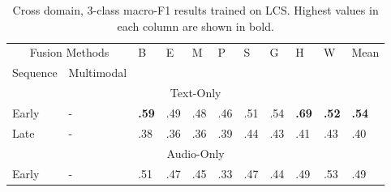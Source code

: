 \documentclass{article}
\begin{document}
\begin{table}[h]
\centering
\caption{Cross domain, 3-class macro-F1 results trained on LCS. Highest values in each column are shown in bold.}
\begin{tabular}{|lllllllllll|}
\hline
\multicolumn{2}{|c|}{Fusion Methods}                                              & \multirow{2}{*}{B} & \multirow{2}{*}{E} & \multirow{2}{*}{M} & \multirow{2}{*}{P} & \multirow{2}{*}{S} & \multirow{2}{*}{G} & \multirow{2}{*}{H} & \multicolumn{1}{l|}{\multirow{2}{*}{W}} & \multirow{2}{*}{Mean} \\ \cline{1-2}
\multicolumn{1}{|l|}{Sequence}               & \multicolumn{1}{l|}{Multimodal}    &                    &                    &                    &                    &                    &                    &                    & \multicolumn{1}{l|}{}                   &                       \\ \hline
\multicolumn{11}{|c|}{Text-Only}                                                                                                                                                                                                                                                                       \\ \hline
\multicolumn{1}{|l|}{Early}                  & \multicolumn{1}{l|}{-}             & \textbf{.59}       & .49                & .48                & .46                & .51                & .54                & \textbf{.69}       & \multicolumn{1}{l|}{\textbf{.52}}       & \textbf{.54}          \\
\multicolumn{1}{|l|}{Late}                   & \multicolumn{1}{l|}{-}             & .38                & .36                & .36                & .39                & .44                & .43                & .41                & \multicolumn{1}{l|}{.43}                & .40                   \\ \hline
\multicolumn{11}{|c|}{Audio-Only}                                                                                                                                                                                                                                                                      \\ \hline
\multicolumn{1}{|l|}{Early}                  & \multicolumn{1}{l|}{-}             & .51                & .47                & .45                & .33                & .47                & .44                & .49                & \multicolumn{1}{l|}{.53}                & .49                   \\

\end{tabular}
\end{table}
\end{document}
